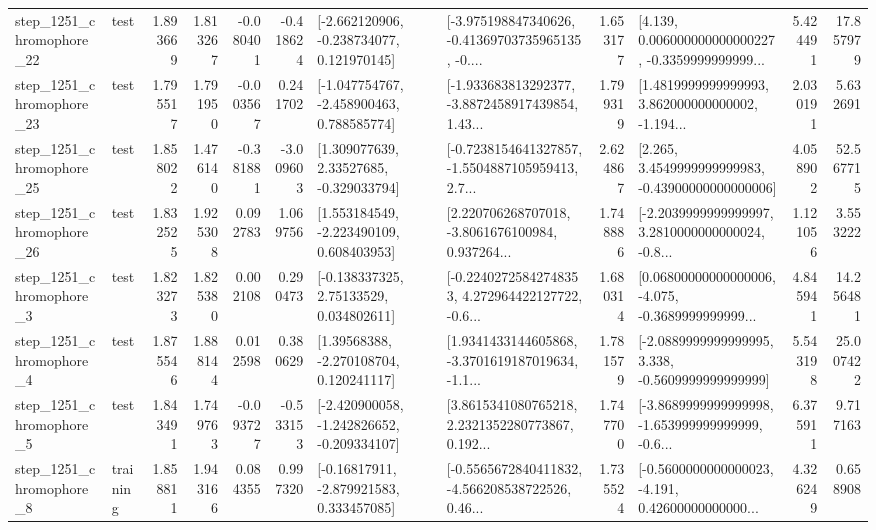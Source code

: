 \begin{tabular}{llrrrrllrlrr}
 step\_1251\_chromophore\_22 &      test &      1.893669 &    1.813267 &     -0.080401 & -0.418624 &   [-2.662120906, -0.238734077, 0.121970145] &  [-3.975198847340626, -0.41369703735965135, -0.... &       1.653177 &  [4.139, 0.006000000000000227, -0.3359999999999... &            5.424491 &         17.857979 \\
 step\_1251\_chromophore\_23 &      test &      1.795517 &    1.791950 &     -0.003567 &  0.241702 &   [-1.047754767, -2.458900463, 0.788585774] &  [-1.933683813292377, -3.8872458917439854, 1.43... &       1.799319 &  [1.4819999999999993, 3.862000000000002, -1.194... &            2.030191 &          5.632691 \\
 step\_1251\_chromophore\_25 &      test &      1.858022 &    1.476140 &     -0.381881 & -3.009603 &     [1.309077639, 2.33527685, -0.329033794] &  [-0.7238154641327857, -1.5504887105959413, 2.7... &       2.624867 &  [2.265, 3.4549999999999983, -0.43900000000000006] &            4.058902 &         52.567715 \\
 step\_1251\_chromophore\_26 &      test &      1.832525 &    1.925308 &      0.092783 &  1.069756 &    [1.553184549, -2.223490109, 0.608403953] &  [2.220706268707018, -3.8061676100984, 0.937264... &       1.748886 &  [-2.2039999999999997, 3.2810000000000024, -0.8... &            1.121056 &          3.553222 \\
  step\_1251\_chromophore\_3 &      test &      1.823273 &    1.825380 &      0.002108 &  0.290473 &     [-0.138337325, 2.75133529, 0.034802611] &  [-0.22402725842748353, 4.272964422127722, -0.6... &       1.680314 &  [0.06800000000000006, -4.075, -0.3689999999999... &            4.845941 &         14.256481 \\
  step\_1251\_chromophore\_4 &      test &      1.875546 &    1.888144 &      0.012598 &  0.380629 &     [1.39568388, -2.270108704, 0.120241117] &  [1.9341433144605868, -3.3701619187019634, -1.1... &       1.781579 &  [-2.0889999999999995, 3.338, -0.5609999999999999] &            5.543198 &         25.007422 \\
  step\_1251\_chromophore\_5 &      test &      1.843491 &    1.749763 &     -0.093727 & -0.533153 &  [-2.420900058, -1.242826652, -0.209334107] &  [3.8615341080765218, 2.2321352280773867, 0.192... &       1.747700 &  [-3.8689999999999998, -1.653999999999999, -0.6... &            6.375911 &          9.717163 \\
  step\_1251\_chromophore\_8 &  training &      1.858811 &    1.943166 &      0.084355 &  0.997320 &    [-0.16817911, -2.879921583, 0.333457085] &  [-0.5565672840411832, -4.566208538722526, 0.46... &       1.735524 &  [-0.5600000000000023, -4.191, 0.42600000000000... &            4.326249 &          0.658908 \\

\end{tabular}
